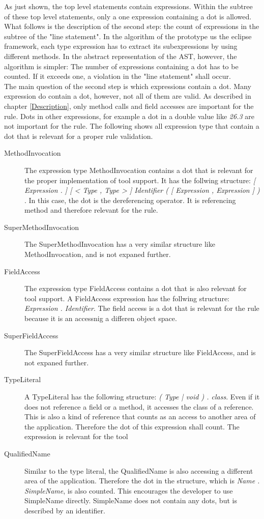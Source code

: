 As just shown, the top level statements contain expressions. Within the subtree of these top level statements, only a one expression containing a dot is allowed.
\\

What follows is the description of the second step: the count of expressions in the subtree of the "line statement". In the algorithm of the prototype us the eclipse framework, each type expression has to extract its subexpressions by using different methods. In the abstract representation of the \acf{AST}, however, the algorithm is simpler: The number of expressions containing a dot has to be counted. If it exceeds one, a violation in the "line statement" shall occur. 
\\

The main question of the second step is which expressions contain a dot. Many expression do contain a dot, however, not all of them are valid. As described in chapter \ref{Description}, only method calls and field accesses are important for the rule. Dots in other expressions, for example a dot in a double value like \textit{26.3} are not important for the rule. The following shows all expression type that contain a dot that is relevant for a proper rule validation. 
\begin{description}
  \item[MethodInvocation] The expression type MethodInvocation contains a dot that is relevant for the proper implementation of tool support. It has the follwing structure: \textit{[ Expression . ] [ < Type { , Type } > ] Identifier ( [ Expression { , Expression } ] ) }. In this case, the dot is the dereferencing operator. It is referencing method and therefore relevant for the rule.
  \item[SuperMethodInvocation] The SuperMethodInvocation has a very similar structure like MethodInvocation, and is not expaned further.
  \item[FieldAccess] The expression type FieldAccess contains a dot that is also relevant for tool support. A FieldAccess expression has the follwing structure: \textit{Expression . Identifier}. The field access is a dot that is relevant for the rule because it is an accessnig a differen object space.
  \item[SuperFieldAccess] The SuperFieldAccess has a very similar structure like FieldAccess, and is not expaned further.
  \item[TypeLiteral] A TypeLiteral has the following structure: \textit{( Type | void ) . class}. Even if it does not reference a field or a method, it accesses the class of a reference. This is also a kind of reference that counts as an access to another area of the application. Therefore the dot of this expression shall count. The expression is relevant for the tool
  \item[QualifiedName] Similar to the type literal, the QualifiedName is also accessing a different area of the application. Therefore the dot in the structure, which is \textit{Name . SimpleName}, is also counted. This encourages the developer to use SimpleName directly. SimpleName does not contain any dots, but is described by an identifier.
\end{description}

